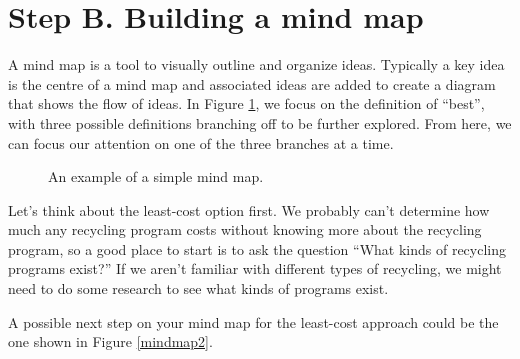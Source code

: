 \newpage

\section*{Step B. Building a mind map}\label{B-mindmap}

A mind map is a tool to visually outline and organize ideas. Typically a key idea is the centre of a mind map and associated ideas are added to create a diagram that shows the flow of ideas. In Figure \ref{mindmap1}, we focus on the definition of ``best'', with three possible definitions
branching off to be further explored. From here, we can focus our attention on one of the three branches
at a time.

\begin{figure}[!htbp]
\caption{An example of a simple mind map.}
\label{mindmap1}
\end{figure}


Let's think about the least-cost option first. We probably can't determine how much any recycling program costs without knowing more about the recycling program, so a good place to start is to ask the question ``What kinds of recycling programs exist?''
If we aren't familiar with different types of recycling, we might need to do some research to see what kinds of programs exist.


A possible next step on your mind map for the least-cost approach could be the one shown in Figure \ref{mindmap2}.

